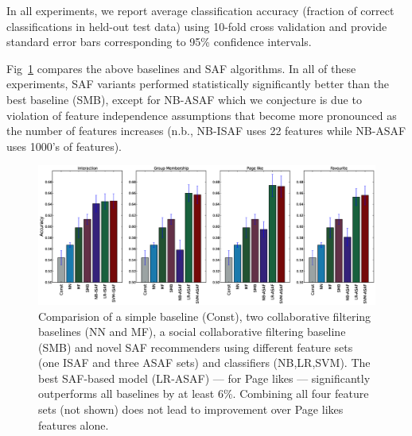 In all experiments, we report average classification accuracy
(fraction of correct classifications in held-out test data) using
10-fold cross validation and provide standard error bars corresponding
to 95\% confidence intervals.

Fig~\ref{Fig1} compares the above baselines and SAF algorithms.  In
all of these experiments, SAF variants performed statistically
significantly better than the best baseline (SMB), except for NB-ASAF
which we conjecture is due to violation of feature independence
assumptions that become more pronounced as the number of features
increases (n.b., NB-ISAF uses 22 features while NB-ASAF uses 1000's of
features).

\begin{figure}[tbh!]
\hspace{-6mm}\includegraphics[width=190mm]{data/plots/accuracy/accuracyLargeNew.eps}
\vspace{-6mm}
\caption{Comparision of a simple baseline (Const), two collaborative
  filtering baselines (NN and MF), a social collaborative filtering
  baseline (SMB) and novel SAF recommenders using different feature
  sets (one ISAF and three ASAF sets) and classifiers (NB,LR,SVM).
  The best SAF-based model (LR-ASAF) --- for Page likes --- significantly outperforms
  all baselines by at least 6\%.  Combining all four feature sets (not shown)
  does not lead to improvement over Page likes features alone.}
\label{Fig1}
\end{figure}

